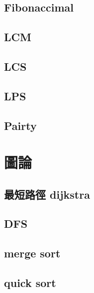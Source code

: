     \subsection{Fibonaccimal}
        
    \subsection{LCM}
        
    \subsection{LCS}
        
    \subsection{LPS}
        
    \subsection{Pairty}
        

\section{圖論}
    \subsection{最短路徑 dijkstra}
        
    \subsection{DFS}
        
    \subsection{merge sort}
          
    \subsection{quick sort}
        
